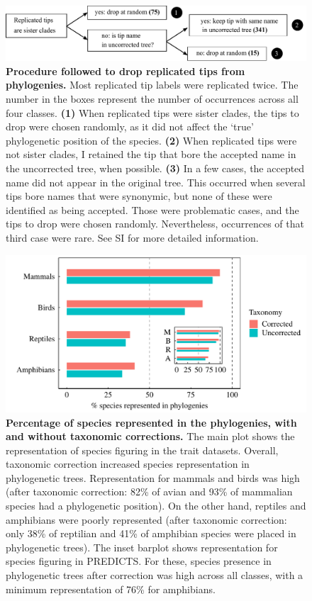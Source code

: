\begin{figure}[h!]
\centering
\includegraphics[scale=0.7]{figures/chapter2/chart_phylorep}
\caption[Procedure followed to drop replicated tips from phylogenies]{\textbf{Procedure followed to drop replicated tips from phylogenies.} Most replicated tip labels were replicated twice. The number in the boxes represent the number of occurrences across all four classes. \textbf{(1)} When replicated tips were sister clades, the tips to drop were chosen randomly, as it did not affect the `true' phylogenetic position of the species. \textbf{(2)} When replicated tips were not sister clades, I retained the tip that bore the accepted name in the uncorrected tree, when possible. \textbf{(3)} In a few cases, the accepted name did not appear in the original tree. This occurred when several tips bore names that were synonymic, but none of these were identified as being accepted. Those were problematic cases, and the tips to drop were chosen randomly. Nevertheless, occurrences of that third case were rare. See SI for more detailed information.}
\label{chart_phylorep}
\end{figure}

\begin{figure}[h!]
\centering
\includegraphics[scale=0.7]{figures/chapter2/Species_representation_phylo}
\caption[Percentage of species represented in the phylogenies, with and without taxonomic corrections]{\textbf{Percentage of species represented in the phylogenies, with and without taxonomic corrections.} The main plot shows the representation of species figuring in the trait datasets. Overall, taxonomic correction increased species representation in phylogenetic trees. Representation for mammals and birds was high (after taxonomic correction: 82\% of avian and 93\% of mammalian species had a phylogenetic position). On the other hand, reptiles and amphibians were poorly represented (after taxonomic correction: only 38\% of reptilian and 41\% of amphibian species were placed in phylogenetic trees). The inset barplot shows representation for species figuring in PREDICTS. For these, species presence in phylogenetic trees after correction was high across all classes, with a minimum representation of 76\% for amphibians.}
\label{species_rep_phylo}
\end{figure}

